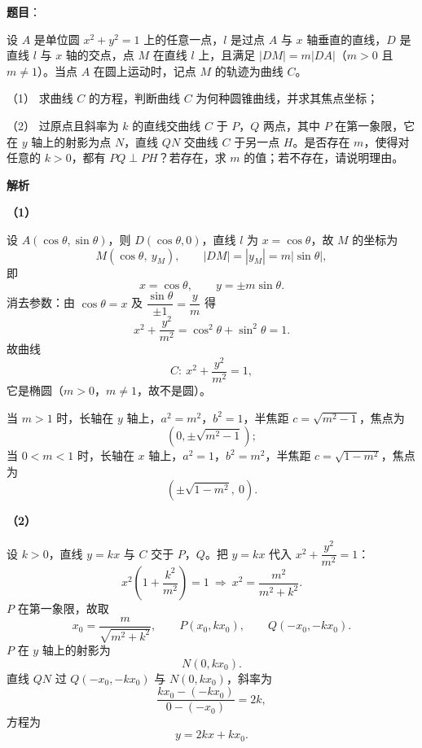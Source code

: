 \begin{answer}

\textbf{题目}：

设 $A$ 是单位圆 $x^2+y^2=1$ 上的任意一点，$l$ 是过点 $A$ 与 $x$ 轴垂直的直线，$D$ 是直线 $l$ 与 $x$ 轴的交点，点 $M$ 在直线 $l$ 上，且满足 $|DM|=m|DA|$（$m>0$ 且 $m\neq1$）。当点 $A$ 在圆上运动时，记点 $M$ 的轨迹为曲线 $C$。

（1） 求曲线 $C$ 的方程，判断曲线 $C$ 为何种圆锥曲线，并求其焦点坐标；

（2） 过原点且斜率为 $k$ 的直线交曲线 $C$ 于 $P$，$Q$ 两点，其中 $P$ 在第一象限，它在 $y$ 轴上的射影为点 $N$，直线 $QN$ 交曲线 $C$ 于另一点 $H$。是否存在 $m$，使得对任意的 $k>0$，都有 $PQ\perp PH$？若存在，求 $m$ 的值；若不存在，请说明理由。

\textbf{解析}

\textbf{（1）}

设 $A(\cos\theta,\sin\theta)$，则 $D(\cos\theta,0)$，直线 $l$ 为 $x=\cos\theta$，故 $M$ 的坐标为
\nopagebreak[4]
\[M(\cos\theta,\ y_M),\qquad |DM|=|y_M|=m|\sin\theta|,\]
即
\nopagebreak[4]
\[x=\cos\theta,\qquad y=\pm m\sin\theta.\]
消去参数：由 $\cos\theta=x$ 及 $\dfrac{\sin\theta}{\pm1}=\dfrac{y}{m}$ 得
\nopagebreak[4]
\[x^2+\frac{y^2}{m^2}=\cos^2\theta+\sin^2\theta=1.\]
故曲线
\nopagebreak[4]
\[C:\ x^2+\frac{y^2}{m^2}=1,\]
它是椭圆（$m>0$，$m\neq1$，故不是圆）。

当 $m>1$ 时，长轴在 $y$ 轴上，$a^2=m^2$，$b^2=1$，半焦距 $c=\sqrt{m^2-1}$，焦点为
\nopagebreak[4]
\[\left(0,\pm\sqrt{m^2-1}\right);\]
当 $0<m<1$ 时，长轴在 $x$ 轴上，$a^2=1$，$b^2=m^2$，半焦距 $c=\sqrt{1-m^2}$，焦点为
\nopagebreak[4]
\[\left(\pm\sqrt{1-m^2},\ 0\right).\]

\textbf{（2）}

设 $k>0$，直线 $y=kx$ 与 $C$ 交于 $P$，$Q$。把 $y=kx$ 代入 $x^2+\dfrac{y^2}{m^2}=1$：
\nopagebreak[4]
\[x^2\left(1+\frac{k^2}{m^2}\right)=1\ \Longrightarrow\ x^2=\frac{m^2}{m^2+k^2}.\]
$P$ 在第一象限，故取
\nopagebreak[4]
\[x_0=\frac{m}{\sqrt{m^2+k^2}},\qquad P(x_0,kx_0),\qquad Q(-x_0,-kx_0).\]
$P$ 在 $y$ 轴上的射影为
\nopagebreak[4]
\[N(0,kx_0).\]
直线 $QN$ 过 $Q(-x_0,-kx_0)$ 与 $N(0,kx_0)$，斜率为
\nopagebreak[4]
\[\frac{kx_0-(-kx_0)}{0-(-x_0)}=2k,\]
方程为
\nopagebreak[4]
\[y=2kx+kx_0.\]


\end{answer}
